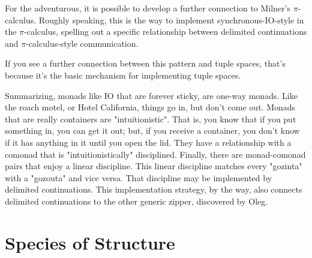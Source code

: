 For the adventurous, it is possible to develop a further connection to
Milner's $\pi$-calculus. Roughly speaking, this is the way to
implement synchronous-IO-style in the $\pi$-calculus, spelling out a
specific relationship between delimited continuations and
$\pi$-calculus-style communication.

If you see a further connection between this pattern and tuple spaces,
that's because it's the basic mechanism for implementing tuple spaces.

Summarizing, monads like IO that are forever sticky, are one-way
monads. Like the roach motel, or Hotel California, things go in, but
don't come out. Monads that are really containers are
"intuitionistic". That is, you know that if you put something in, you
can get it out; but, if you receive a container, you don't know if it
has anything in it until you open the lid. They have a relationship
with a comonad that is "intuitionistically" disciplined. Finally,
there are monad-comonad pairs that enjoy a linear discipline. This
linear discipline matches every "gozinta" with a "gozouta" and vice
versa. That discipline may be implemented by delimited
continuations. This implementation strategy, by the way, also connects
delimited continuations to the other generic zipper, discovered by
Oleg.

\section{Species of Structure}